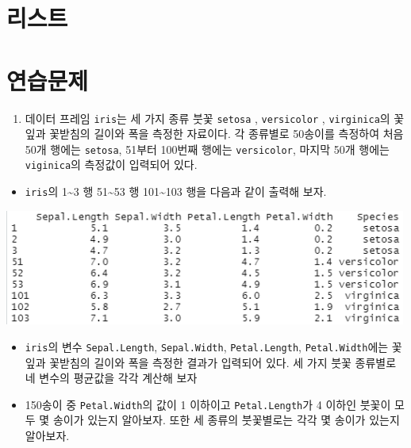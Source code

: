 \documentclass[
]{book}
\providecommand{\tightlist}{%
  \setlength{\itemsep}{0pt}\setlength{\parskip}{0pt}}
\begin{document}
\hypertarget{section-list}{%
\section{리스트}\label{section-list}}

\hypertarget{uxc5f0uxc2b5uxbb38uxc81c}{%
\section{연습문제}\label{uxc5f0uxc2b5uxbb38uxc81c}}

\begin{enumerate}
\def\labelenumi{\arabic{enumi}.}
\tightlist
\item
  데이터 프레임 \texttt{iris}는 세 가지 종류 붓꽃 \texttt{setosa} , \texttt{versicolor} , \texttt{virginica}의 꽃잎과 꽃받침의 길이와 폭을 측정한 자료이다. 각 종류별로 50송이를 측정하여 처음 50개 행에는 \texttt{setosa}, 51부터 100번째 행에는 \texttt{versicolor}, 마지막 50개 행에는 \texttt{viginica}의 측정값이 입력되어 있다.
\end{enumerate}

\begin{itemize}
\tightlist
\item
  \texttt{iris}의 1\textasciitilde3 행 51\textasciitilde53 행 101\textasciitilde103 행을 다음과 같이 출력해 보자.
\end{itemize}

\includegraphics[width=5.20833in,height=\textheight]{Figure/ch2_ex_21_1.png}

\begin{itemize}
\item
  \texttt{iris}의 변수 \texttt{Sepal.Length}, \texttt{Sepal.Width}, \texttt{Petal.Length}, \texttt{Petal.Width}에는 꽃잎과 꽃받침의 길이와 폭을 측정한 결과가 입력되어 있다. 세 가지 붓꽃 종류별로 네 변수의 평균값을 각각 계산해 보자
\item
  150송이 중 \texttt{Petal.Width}의 값이 1 이하이고 \texttt{Petal.Length}가 4 이하인 붓꽃이 모두 몇 송이가 있는지 알아보자. 또한 세 종류의 붓꽃별로는 각각 몇 송이가 있는지 알아보자.
\end{itemize}
\end{document}
